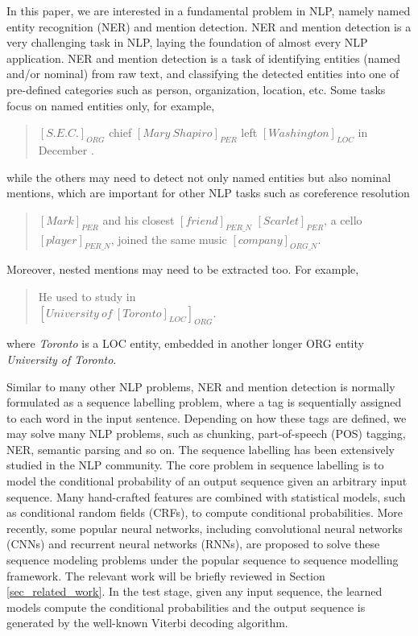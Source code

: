 \documentclass[11pt,a4paper]{article}
\begin{document}
In this paper, we are interested in a fundamental problem in NLP, namely named entity recognition (NER) and mention detection. NER and mention detection is a very challenging task in NLP, laying the foundation of almost every NLP application.
NER and mention detection is a task of identifying entities (named and/or nominal) from raw text, and classifying  the detected entities into one of pre-defined categories such as person, organization, location, etc. Some tasks focus on named entities only, for example, 
\begin{quote}
	\label{emp:4types}
	\small
	${[S.E.C.]}_{ORG}$ chief ${[Mary\ Shapiro]}_{PER}$ left ${[Washington]}_{LOC}$ in December .
\end{quote}
while the others may need to detect not only named entities but also nominal mentions, which are important for other NLP tasks such as coreference resolution
\begin{quote}
	\label{emp:10types}
	\small
	$[Mark]_{PER}$ and his closest $[friend]_{PER\_N}$ $[Scarlet]_{PER}$, a cello $[player]_{PER\_N}$, joined the same music $[company]_{ORG\_N}$.
\end{quote}
Moreover, nested mentions may need to be extracted too. For example, 
\begin{quote}
	\label{emp:nested-ex}
	\small
	He used to study in \\  ${[University\ of\ {[Toronto]}_{LOC}]}_{ORG}$.
\end{quote}
where {\it Toronto} is a LOC entity, embedded in another longer ORG entity {\it University of Toronto}.

Similar to many other NLP problems, NER and mention detection is normally formulated as a sequence labelling problem, where a tag is sequentially assigned to each word in the input sentence. Depending on how these tags are defined, we may solve many NLP problems, such as chunking, part-of-speech (POS) tagging, NER, semantic parsing and so on. The sequence labelling has been extensively studied in the NLP community. The core problem in sequence labelling is to model the conditional probability of an output sequence given an arbitrary input sequence. Many hand-crafted features are combined with statistical models, such as conditional random fields (CRFs), to compute conditional probabilities. More recently, some popular neural networks, including convolutional neural networks (CNNs) and recurrent neural networks (RNNs), are proposed to solve these sequence modeling problems under the popular sequence to sequence modelling framework. The relevant work will be briefly reviewed in Section \ref{sec_related_work}. 
In the test stage, given any input sequence, the learned models compute the conditional probabilities and the output sequence is generated by the well-known Viterbi decoding algorithm. 
\end{document}

